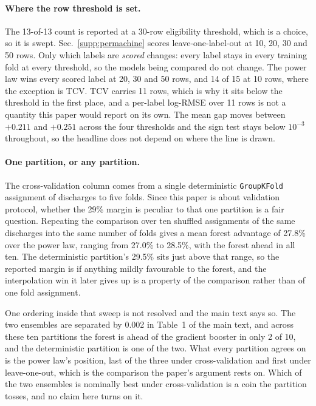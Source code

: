 \documentclass[12pt,letterpaper]{article}
\begin{document}
\paragraph{Where the row threshold is set.} The 13-of-13 count is reported at a
30-row eligibility threshold, which is a choice, so it is swept.
Sec.~\ref{supp:permachine} scores leave-one-label-out at 10, 20,
30 and 50 rows. Only which labels are \emph{scored} changes: every label stays in every
training fold at every threshold, so the models being compared do not change.
The power law wins every scored label at 20, 30 and 50 rows, and 14 of 15 at 10
rows, where the exception is TCV. TCV carries 11 rows, which is why it sits
below the threshold in the first place, and a per-label log-RMSE over 11 rows
is not a quantity this paper would report on its own. The mean gap moves between
$+0.211$ and $+0.251$ across the four thresholds and the sign test stays below
$10^{-3}$ throughout, so the headline does not depend on where the line is
drawn.

\paragraph{One partition, or any partition.} The cross-validation column comes
from a single deterministic \texttt{GroupKFold} assignment of discharges to five
folds. Since this paper is about validation protocol, whether the 29\% margin is
peculiar to that one partition is a fair question. Repeating the comparison over
ten shuffled assignments of the same discharges into the same number of folds
gives a mean forest advantage of 27.8\% over the power law, ranging from 27.0\%
to 28.5\%, with the forest ahead in all ten. The deterministic partition's 29.5\%
sits just above that range, so the reported margin is if anything mildly
favourable to the forest, and the interpolation win it later gives up is a
property of the comparison rather than of one fold assignment.

One ordering inside that sweep is not resolved and the main text says so. The
two ensembles are separated by 0.002 in Table~1 of the main text, and across
these ten partitions the forest is ahead of the gradient booster in only 2 of
10, and the deterministic partition is one of the two. What every partition
agrees on is the power law's position, last of the three under cross-validation
and first under leave-one-out, which is the comparison the paper's argument
rests on. Which of the two ensembles is nominally best under cross-validation is
a coin the partition tosses, and no claim here turns on it.
\end{document}
